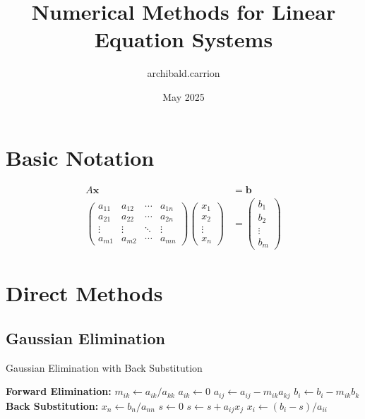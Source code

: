 \documentclass{article}
\title{Numerical Methods for Linear Equation Systems}
\author{archibald.carrion}
\date{May 2025}
\begin{document}
\maketitle

\tableofcontents

\section{Basic Notation}

\begin{align}
A\mathbf{x} &= \mathbf{b}\\
\begin{pmatrix}
a_{11} & a_{12} & \cdots & a_{1n} \\
a_{21} & a_{22} & \cdots & a_{2n} \\
\vdots & \vdots & \ddots & \vdots \\
a_{m1} & a_{m2} & \cdots & a_{mn}
\end{pmatrix}
\begin{pmatrix}
x_1 \\
x_2 \\
\vdots \\
x_n
\end{pmatrix} &= 
\begin{pmatrix}
b_1 \\
b_2 \\
\vdots \\
b_m
\end{pmatrix}
\end{align}

\section{Direct Methods}

\subsection{Gaussian Elimination}

\begin{algorithm}
\caption{Gaussian Elimination with Back Substitution}
\begin{algorithmic}[1]
\State \textbf{Forward Elimination:}
        \State $m_{ik} \gets a_{ik}/a_{kk}$
        \State $a_{ik} \gets 0$
            \State $a_{ij} \gets a_{ij} - m_{ik}a_{kj}$
        \EndFor
        \State $b_i \gets b_i - m_{ik}b_k$
    \EndFor
\EndFor
\State \textbf{Back Substitution:}
\State $x_n \gets b_n/a_{nn}$
    \State $s \gets 0$
        \State $s \gets s + a_{ij}x_j$
    \EndFor
    \State $x_i \gets (b_i - s)/a_{ii}$
\EndFor
\end{algorithmic}
\end{algorithm}
\end{document}
